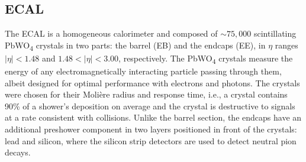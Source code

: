 \documentclass[12pt]{article}
\begin{document}
\subsection{ECAL}
The ECAL is a homogeneous calorimeter and composed of  ${\sim} 75,000$ scintillating PbWO\textsubscript{4} crystals in two parts: the barrel (EB) and the endcaps (EE), in $\eta$ ranges $|\eta| < 1.48$ and $1.48 < |\eta| < 3.00$, respectively. The PbWO\textsubscript{4} crystals measure the energy of any electromagnetically interacting particle passing through them, albeit designed for optimal performance with electrons and photons. The crystals were chosen for their Moli\`ere radius and response time, i.e., a crystal contains 90\% of a shower's deposition on average and the crystal is destructive to signals at a rate consistent with collisions. Unlike the barrel section, the endcaps have an additional preshower component in two layers positioned in front of the crystals: lead and silicon, where the silicon strip detectors are used to detect neutral pion decays.\par


\end{document}
